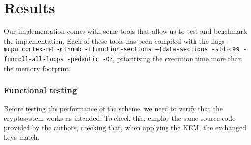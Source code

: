 \section{Results}
Our implementation comes with some tools that allow us to test and benchmark the implementation.
Each of these tools has been compiled with the flags \texttt{-mcpu=cortex-m4 -mthumb -ffunction-sections --fdata-sections -std=c99 -funroll-all-loops -pedantic -O3},
prioritizing the execution time more than the memory footprint.

\subsubsection*{\textbf{Functional testing}}
Before testing the performance of the scheme, we need to verify that the cryptosystem works as intended.
To check this, employ the same source code provided by the authors, checking that, when applying the KEM, the exchanged keys match.


